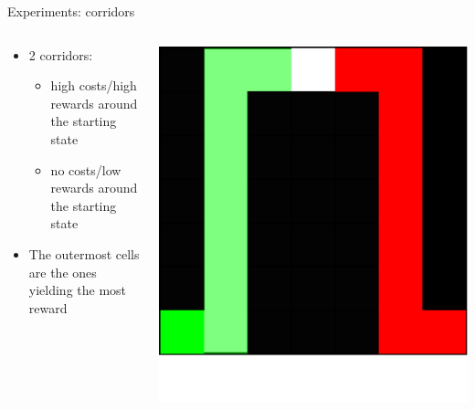 \documentclass{beamer}
\begin{document}
    \begin{frame}{Experiments: corridors}

        \begin{columns}
            \begin{column}{0.7\textwidth}
                \begin{itemize}
                    \item 2 corridors:
                    \begin{itemize}
                        \item high costs/high rewards around the starting state
                        \item no costs/low rewards around the starting state
                    \end{itemize}
                    \item The outermost cells are the ones yielding the most reward
                \end{itemize}
            \end{column}
            \begin{column}{0.3\textwidth}  %
                \begin{center}
                    \includegraphics[width=\textwidth]{img/env-corridor.pdf}
                \end{center}
            \end{column}
        \end{columns}

    \end{frame}
\end{document}
